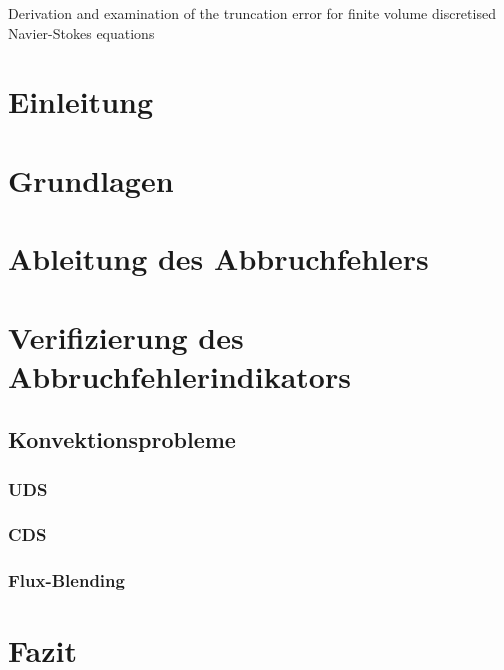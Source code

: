 \documentclass[bigchapter,twoside,report,11pt,type=bsc,colorback,accentcolor=tud2c]{tudthesis}
\begin{document}
%
{Derivation and examination of the truncation error for finite volume discretised Navier-Stokes equations}
\author{Paul Lange}
\dateofexam{\today}{\today}
\makethesistitle
{}

\tableofcontents
\listoffigures

\chapter{Einleitung}

\cleardoublepage

\chapter{Grundlagen}






\cleardoublepage

\chapter{Ableitung des Abbruchfehlers}
\label{chap:herleitung}





\chapter{Verifizierung des Abbruchfehlerindikators}
%

\section{Konvektionsprobleme}
\subsection{UDS}
\subsection{CDS}
\subsection{Flux-Blending}

\chapter{Fazit}


\appendix





%
%

  \cleardoublepage




\nocite{*}
\end{document}
